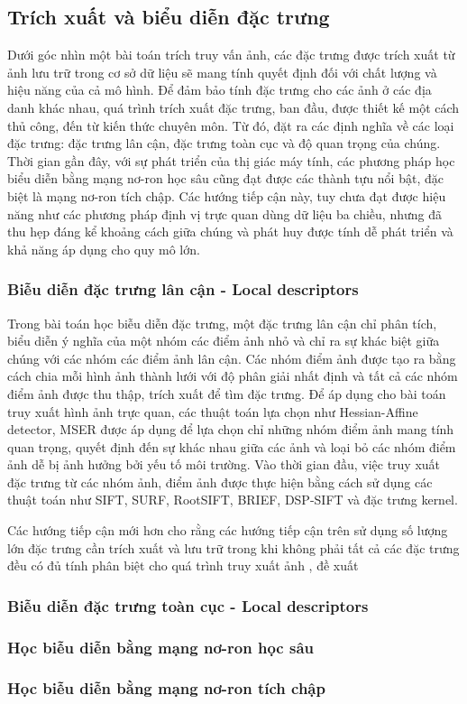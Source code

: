 \subsection{Trích xuất và biểu diễn đặc trưng}

Dưới góc nhìn một bài toán trích truy vấn ảnh, các đặc trưng được trích xuất từ ảnh lưu trữ trong cơ sở dữ liệu sẽ mang tính quyết định đối với chất lượng và hiệu năng của cả mô hình. Để đảm bảo tính đặc trưng cho các ảnh ở các địa danh khác nhau, quá trình trích xuất đặc trưng, ban đầu, được thiết kế một cách thủ công, đến từ kiến thức chuyên môn. Từ đó, đặt ra các định nghĩa về các loại đặc trưng: đặc trưng lân cận, đặc trưng toàn cục và độ quan trọng của chúng. Thời gian gần đây, với sự phát triển của thị giác máy tính, các phương pháp học biểu diễn bằng mạng nơ-ron học sâu cũng đạt được các thành tựu nổi bật, đặc biệt là mạng nơ-ron tích chập. Các hướng tiếp cận này, tuy chưa đạt được hiệu năng như các phương pháp định vị trực quan dùng dữ liệu ba chiều, nhưng đã thu hẹp đáng kể khoảng cách giữa chúng và phát huy được tính dễ phát triển và khả năng áp dụng cho quy mô lớn.

\subsubsection{Biễu diễn đặc trưng lân cận  - Local descriptors}

Trong bài toán học biễu diễn đặc trưng, một đặc trưng lân cận chỉ phân tích, biểu diễn ý nghĩa của một nhóm các điểm ảnh nhỏ và chỉ ra sự khác biệt giữa chúng với các nhóm các điểm ảnh lân cận\cite{CGV-017-localdescriptors}. Các nhóm điểm ảnh được tạo ra bằng cách chia mỗi hình ảnh thành lưới với độ phân giải nhất định và tất cả các nhóm điểm ảnh được thu thập, trích xuất để tìm đặc trưng. Để áp dụng cho bài toán truy xuất hình ảnh trực quan, các thuật toán lựa chọn như Hessian-Affine detector\cite{hessian-affine-detector}, MSER\cite{MSER-detector} được áp dụng để lựa chọn chỉ những nhóm điểm ảnh mang tính quan trọng, quyết định đến sự khác nhau giữa các ảnh và loại bỏ các nhóm điểm ảnh dễ bị ảnh hưởng bởi yếu tố môi trường. Vào thời gian đầu, việc truy xuất đặc trưng từ các nhóm ảnh, điểm ảnh được thực hiện bằng cách sử dụng các thuật toán như SIFT\cite{lowe1999object}, SURF\cite{bay2006surf}, RootSIFT\cite{Arandjelovi2012ThreeTE}, BRIEF\cite{brief}, DSP-SIFT\cite{Dong2014DomainsizePI} và đặc trưng kernel\cite{kernel-descriptors}.

Các hướng tiếp cận mới hơn cho rằng các hướng tiếp cận trên sử dụng số lượng lớn đặc trưng cần trích xuất và lưu trữ trong khi không phải tất cả các đặc trưng đều có đủ tính phân biệt cho quá trình truy xuất ảnh \cite{predicting-good-features}, đề xuất

\subsubsection{Biễu diễn đặc trưng toàn cục  - Local descriptors}

\subsubsection{Học biễu diễn bằng mạng nơ-ron học sâu}

\subsubsection{Học biễu diễn bằng mạng nơ-ron tích chập}
